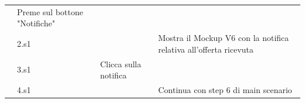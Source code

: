 \begin{longtable}{|C{3.0cm}|C{1.3cm}|L{5.2cm}|L{5.2cm}|}
                        & Preme sul bottone "Notifiche"
                        & \\
                        & 2.s1
                        & 
                        & Mostra il Mockup V6 con la notifica relativa all'offerta ricevuta\\
                        & 3.s1
                        & Clicca sulla notifica
                        & \\
                        & 4.s1
                        &
                        & Continua con step 6 di main scenario\\
                \hline
            \end{longtable}